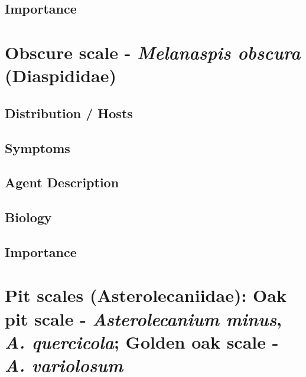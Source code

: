 \documentclass[
]{book}
\begin{document}
\subsection*{Importance}\label{importance-9}

\section*{\texorpdfstring{Obscure scale - \emph{Melanaspis obscura} (Diaspididae)}{Obscure scale - Melanaspis obscura (Diaspididae)}}\label{obscure-scale---melanaspis-obscura-diaspididae}

\subsection*{Distribution / Hosts}\label{distribution-hosts-10}

\subsection*{Symptoms}\label{symptoms-10}

\subsection*{Agent Description}\label{agent-description-10}

\subsection*{Biology}\label{biology-10}

\subsection*{Importance}\label{importance-10}

\section*{\texorpdfstring{Pit scales (Asterolecaniidae): Oak pit scale - \emph{Asterolecanium minus}, \emph{A. quercicola}; Golden oak scale - \emph{A. variolosum}}{Pit scales (Asterolecaniidae): Oak pit scale - Asterolecanium minus, A. quercicola; Golden oak scale - A. variolosum}}\label{pit-scales-asterolecaniidae-oak-pit-scale---asterolecanium-minus-a.-quercicola-golden-oak-scale---a.-variolosum}
\end{document}
